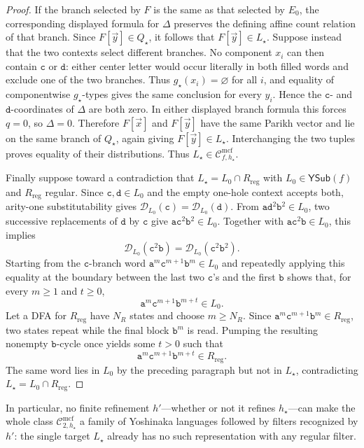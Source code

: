 \documentclass[11pt]{article}
\numberwithin{equation}{section}
\theoremstyle{plain}
\theoremstyle{definition}
\theoremstyle{remark}
\newcommand{\Cmcf}[2]{\mathcal{C}^{\mathrm{mcf}}_{#1,#2}}
\newcommand{\D}{\mathcal{D}}
\newcommand{\tuple}[1]{\vec{#1}}
\newcommand{\YSub}[1]{\mathsf{YSub}(#1)}
\begin{document}
\begin{proof}
If the branch selected by $F$ is the same as that selected by $E_0$, the
corresponding displayed formula for $\Delta$ preserves the defining affine
count relation of that branch.  Since $F[\tuple y]\in Q_\star$, it follows
that $F[\tuple y]\in L_\star$.  Suppose instead that the two contexts select
different branches.  No component $x_i$ can then contain $\mathtt c$ or
$\mathtt d$: either center letter would occur literally in both filled words
and exclude one of the two branches.  Thus $g_\star(x_i)=\varnothing$ for all
$i$, and equality of componentwise $g_\star$-types gives the same conclusion
for every $y_i$.  Hence the $\mathtt c$- and $\mathtt d$-coordinates of
$\Delta$ are both zero.  In either displayed branch formula this forces
$q=0$, so $\Delta=0$.  Therefore $F[\tuple x]$ and $F[\tuple y]$ have the same
Parikh vector and lie on the same branch of $Q_\star$, again giving
$F[\tuple y]\in L_\star$.  Interchanging the two tuples proves equality of
their distributions.  Thus $L_\star\in\Cmcf{f}{h_\star}$.

Finally suppose toward a contradiction that
$L_\star=L_0\cap R_{\mathrm{reg}}$ with $L_0\in\YSub{f}$ and
$R_{\mathrm{reg}}$ regular.  Since
$\mathtt c,\mathtt d\in L_0$ and the empty one-hole context accepts both,
arity-one substitutability gives
$\D_{L_0}(\mathtt c)=\D_{L_0}(\mathtt d)$.  From
$\mathtt a\mathtt d^2\mathtt b^2\in L_0$, two successive replacements of
$\mathtt d$ by $\mathtt c$ give
$\mathtt a\mathtt c^2\mathtt b^2\in L_0$.  Together with
$\mathtt a\mathtt c^2\mathtt b\in L_0$, this implies
\[
  \D_{L_0}(\mathtt c^2\mathtt b)
  =\D_{L_0}(\mathtt c^2\mathtt b^2).
\]
Starting from the $\mathtt c$-branch word
$\mathtt a^m\mathtt c^{m+1}\mathtt b^m\in L_0$ and repeatedly applying this
equality at the boundary between the last two $\mathtt c$'s and the first
$\mathtt b$ shows that, for every $m\ge1$ and $t\ge0$,
\[
  \mathtt a^m\mathtt c^{m+1}\mathtt b^{m+t}\in L_0.
\]
Let a DFA for $R_{\mathrm{reg}}$ have $N_R$ states and choose $m\ge N_R$.  Since
$\mathtt a^m\mathtt c^{m+1}\mathtt b^m\in R_{\mathrm{reg}}$, two states repeat while the
final block $\mathtt b^m$ is read.  Pumping the resulting nonempty
$\mathtt b$-cycle once yields some $t>0$ such that
\[
  \mathtt a^m\mathtt c^{m+1}\mathtt b^{m+t}\in R_{\mathrm{reg}}.
\]
The same word lies in $L_0$ by the preceding paragraph but not in $L_\star$,
contradicting $L_\star=L_0\cap R_{\mathrm{reg}}$.
\end{proof}

In particular, no finite refinement $h'$---whether or not it refines
$h_\star$---can make the whole class $\Cmcf{2}{h_\star}$ a family of
Yoshinaka languages followed by filters recognized by $h'$: the single target
$L_\star$ already has no such representation with any regular filter.
\end{document}
